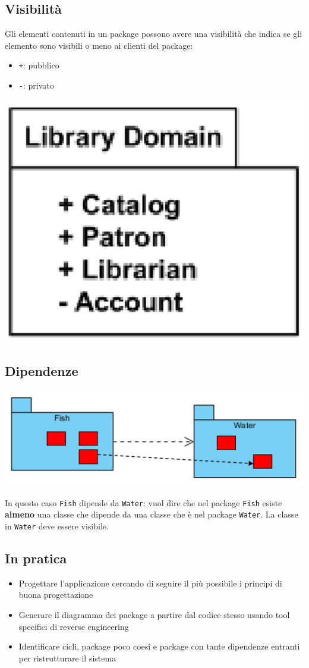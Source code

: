 \documentclass[12pt, a4paper]{report}
\begin{document}
\subsection{Visibilità}
Gli elementi contenuti in un package possono avere una visibilità che indica se gli elemento sono visibili o meno ai clienti del package:
\begin{itemize}
    \item \texttt{+}: pubblico
    \item \texttt{-}: privato
\end{itemize}
\begin{center}
    \includegraphics[width=.2\textwidth]{Immagini/packagevisibility.png}
\end{center}
\newpage
\subsection{Dipendenze}
\begin{center}
    \includegraphics[width=.5\textwidth]{Immagini/packagedipendence.png}
\end{center}
In questo caso \texttt{Fish} dipende da \texttt{Water}: vuol dire che nel package \texttt{Fish} esiste \textbf{almeno} una classe che dipende da una classe che è nel package \texttt{Water}. La classe in \texttt{Water} deve essere visibile.
\subsection{In pratica}
\begin{itemize}
    \item Progettare l'applicazione cercando di seguire il più possibile i principi di buona progettazione
    \item Generare il diagramma dei package a partire dal  codice stesso usando tool specifici di reverse engineering
    \item Identificare cicli, package poco coesi e package con tante dipendenze entranti per ristrutturare il sistema
\end{itemize}
\end{document}
